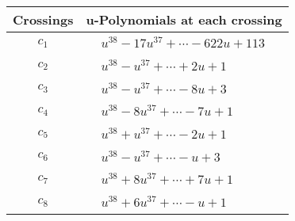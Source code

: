 \documentclass[1p]{elsarticle_modified}
\theoremstyle{definition}
\begin{document}
\begin{tabular}{m{50pt}|m{274pt}}
Crossings & \hspace{64pt}u-Polynomials at each crossing \\
\hline $$\begin{aligned}c_{1}\end{aligned}$$&$\begin{aligned}
&u^{38}-17 u^{37}+\cdots-622 u+113
\end{aligned}$\\
\hline $$\begin{aligned}c_{2}\end{aligned}$$&$\begin{aligned}
&u^{38}- u^{37}+\cdots+2 u+1
\end{aligned}$\\
\hline $$\begin{aligned}c_{3}\end{aligned}$$&$\begin{aligned}
&u^{38}- u^{37}+\cdots-8 u+3
\end{aligned}$\\
\hline $$\begin{aligned}c_{4}\end{aligned}$$&$\begin{aligned}
&u^{38}-8 u^{37}+\cdots-7 u+1
\end{aligned}$\\
\hline $$\begin{aligned}c_{5}\end{aligned}$$&$\begin{aligned}
&u^{38}+u^{37}+\cdots-2 u+1
\end{aligned}$\\
\hline $$\begin{aligned}c_{6}\end{aligned}$$&$\begin{aligned}
&u^{38}- u^{37}+\cdots- u+3
\end{aligned}$\\
\hline $$\begin{aligned}c_{7}\end{aligned}$$&$\begin{aligned}
&u^{38}+8 u^{37}+\cdots+7 u+1
\end{aligned}$\\
\hline $$\begin{aligned}c_{8}\end{aligned}$$&$\begin{aligned}
&u^{38}+6 u^{37}+\cdots- u+1
\end{aligned}$\\

\end{tabular}
\end{document}
